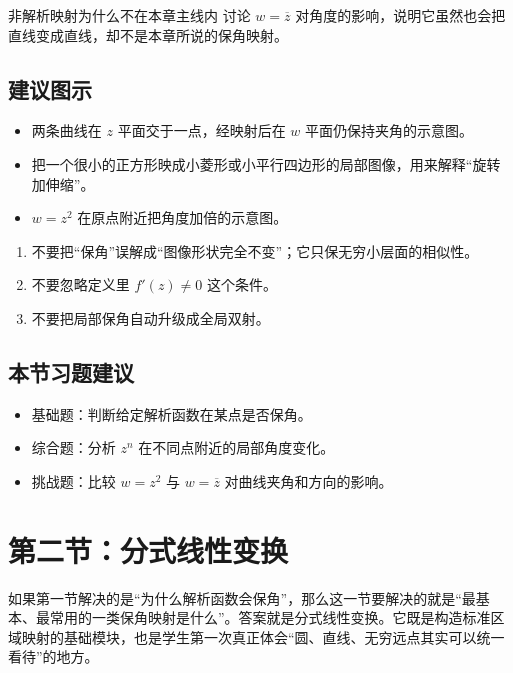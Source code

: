 \begin{lizi}{非解析映射为什么不在本章主线内}{}
讨论 $w=\overline{z}$ 对角度的影响，说明它虽然也会把直线变成直线，却不是本章所说的保角映射。
\end{lizi}

\subsection*{建议图示}
\begin{itemize}
    \item 两条曲线在 $z$ 平面交于一点，经映射后在 $w$ 平面仍保持夹角的示意图。
    \item 把一个很小的正方形映成小菱形或小平行四边形的局部图像，用来解释``旋转加伸缩''。
    \item $w=z^2$ 在原点附近把角度加倍的示意图。
\end{itemize}

\begin{jinshi}[本节易错点]
\begin{enumerate}
    \item 不要把``保角''误解成``图像形状完全不变''；它只保无穷小层面的相似性。
    \item 不要忽略定义里 $f'(z)\neq 0$ 这个条件。
    \item 不要把局部保角自动升级成全局双射。
\end{enumerate}
\end{jinshi}

\subsection*{本节习题建议}
\begin{itemize}
    \item 基础题：判断给定解析函数在某点是否保角。
    \item 综合题：分析 $z^n$ 在不同点附近的局部角度变化。
    \item 挑战题：比较 $w=z^2$ 与 $w=\overline{z}$ 对曲线夹角和方向的影响。
\end{itemize}

\section{第二节：分式线性变换}

\begin{wulibj}[本节要解决的问题]
如果第一节解决的是``为什么解析函数会保角''，那么这一节要解决的就是``最基本、最常用的一类保角映射是什么''。答案就是分式线性变换。它既是构造标准区域映射的基础模块，也是学生第一次真正体会``圆、直线、无穷远点其实可以统一看待''的地方。
\end{wulibj}

